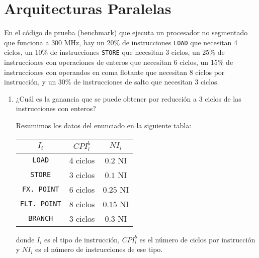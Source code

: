 \section{Arquitecturas Paralelas}

\begin{ejercicio}
    En el código de prueba (benchmark) que ejecuta un procesador no segmentado que funciona a
    $300$ MHz, hay un 20\% de instrucciones \verb|LOAD| que necesitan 4 ciclos, un 10\% de
    instrucciones \verb|STORE| que necesitan 3 ciclos, un 25\% de instrucciones con operaciones de
    enteros que necesitan 6 ciclos, un 15\% de instrucciones con operandos en coma flotante que
    necesitan 8 ciclos por instrucción, y un 30\% de instrucciones de salto que necesitan 3 ciclos.
    \begin{enumerate}
        \item ¿Cuál es la ganancia que se puede obtener por reducción a 3 ciclos de las instrucciones
        con enteros?

        Resumimos los datos del enunciado en la siguiente tabla:
        \begin{table}[H]
            \centering
            \begin{tabular}{c|c|c}
                $I_i$ & $CPI_i^b$ & $NI_i$ \\
                \hline
                \verb|LOAD| & 4 ciclos & $0.2$ NI \\ 
                \verb|STORE| & 3 ciclos & $0.1$ NI \\
                \verb|FX. POINT| & 6 ciclos & $0.25$ NI \\
                \verb|FLT. POINT| & 8 ciclos & $0.15$ NI \\
                \verb|BRANCH| & 3 ciclos & $0.3$ NI
            \end{tabular}
        \end{table}
        donde $I_i$ es el tipo de instrucción,
        $CPI_i^b$ es el número de ciclos por instrucción y
        $NI_i$ es el número de instrucciones de ese tipo.


\end{enumerate}
\end{ejercicio}
